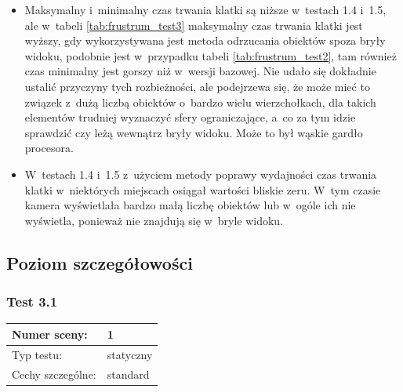 \documentclass[a4paper,twoside,12pt]{book}
\begin{document}
\begin{itemize}
    \item Maksymalny i~minimalny czas trwania klatki są niższe w~testach 1.4 i~1.5, ale w~tabeli \ref{tab:frustrum_test3} maksymalny czas trwania klatki jest wyższy, gdy wykorzystywana jest metoda odrzucania obiektów spoza bryły widoku, podobnie jest w~przypadku tabeli \ref{tab:frustrum_test2}, tam również czas minimalny jest gorszy niż w~wersji bazowej. Nie udało się dokładnie ustalić przyczyny tych rozbieżności, ale podejrzewa się, że może mieć to związek z~dużą liczbą obiektów o~bardzo wielu wierzchołkach, dla takich elementów trudniej wyznaczyć sfery ograniczające, a~co za tym idzie sprawdzić czy leżą wewnątrz bryły widoku. Może to był wąskie gardło procesora.
    \item W~testach 1.4 i~1.5 z~użyciem metody poprawy wydajności czas trwania klatki w~niektórych miejscach osiągał wartości bliskie zeru. W~tym czasie kamera wyświetlała bardzo małą liczbę obiektów lub w~ogóle ich nie wyświetla, ponieważ nie znajdują się w~bryle widoku.
\end{itemize}



\subsection{Poziom szczegółowości}
\subsubsection{Test 3.1}
\begin{tabular}{|l||l|}
\hline
Numer sceny: & 1 \\
\hline
Typ testu: & statyczny \\
\hline
Cechy szczególne: & standard \\
\hline
\end{tabular}\\

\vbox{}
\end{document}
